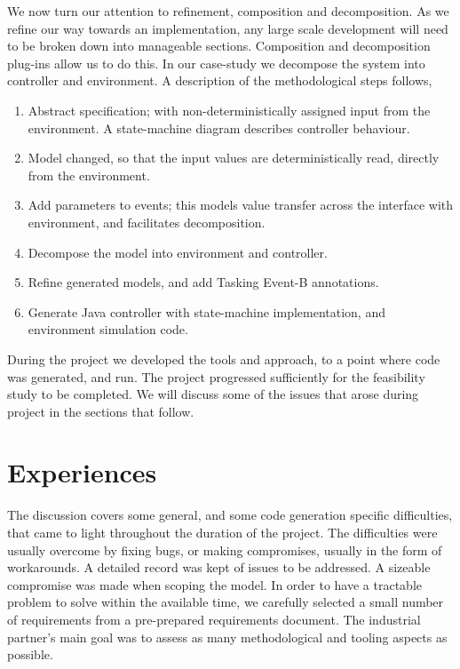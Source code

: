 \documentclass{llncs}%
\begin{document}
We now turn our attention to refinement, composition and decomposition. As we refine our way towards an implementation, any large scale development will need to be broken down into manageable sections. Composition and decomposition~\cite{decomp2010c} plug-ins allow us to do this. In our case-study we decompose the system into controller and environment. A description of the methodological steps follows, 
%
\begin{enumerate}[noitemsep]
\item Abstract specification; with non-deterministically assigned input from the environment. A state-machine diagram describes controller behaviour.
\item Model changed, so that the input values are deterministically read, directly from the environment.
\item Add parameters to events; this models value transfer across the interface with environment, and facilitates decomposition.
\item Decompose the model into environment and controller.
\item Refine generated models, and add Tasking Event-B annotations.
\item Generate Java controller with state-machine implementation, and environment simulation code.
\end{enumerate}
%
During the project we developed the tools and approach, to a point where code was generated, and run. The project progressed sufficiently for the feasibility study to be completed. We will discuss some of the issues that arose during project in the sections that follow.
%
%
\section{Experiences}\label{Experience}
The discussion covers some general, and some code generation specific difficulties, that came to light throughout the duration of the project. The difficulties were usually overcome by fixing bugs, or making compromises, usually in the form of workarounds. A detailed record was kept of issues to be addressed. A sizeable compromise was made when scoping the model. In order to have a tractable problem to solve within the available time, we carefully selected a small number of requirements from a pre-prepared requirements document. The industrial partner's main goal was to assess as many methodological and tooling aspects as possible. 
\end{document}
